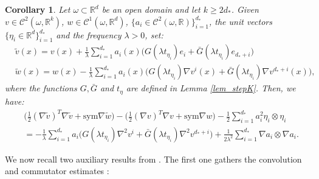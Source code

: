 \documentclass[reqno,twoside,11pt]{amsart}
\newcommand{\sym}{\mathrm{sym}}
\newcommand{\R}{\mathbb{R}}
\numberwithin{equation}{section}
\theoremstyle{plain}
\newtheorem{corollary}[theorem]{Corollary}
\theoremstyle{definition}
\begin{document}
\begin{corollary}\label{cor_indepK}
Let $\omega\subset\R^d$ be an open domain and let $k\geq 2d_*$.
Given $v\in \mathcal{C}^2(\omega, \R^{k})$, $w\in
\mathcal{C}^1(\omega, \R^{d})$,  $\{a_i\in
\mathcal{C}^2(\omega,\R)\}_{i=1}^{d_*}$, the unit vectors
$\{\eta_i\in\R^d\}_{i=1}^{d_*}$ and the frequency $\lambda>0$, set:
\begin{equation*}
\begin{split}
&\tilde v(x) = v(x) + \frac{1}{\lambda} \sum_{i=1}^{d_*} a_i(x)
\Big(G(\lambda t_{\eta_i})e_i +\bar G(\lambda t_{\eta_i})e_{d_*+i}\Big)  \\
& \tilde w(x) = w(x) -\frac{1}{\lambda} \sum_{i=1}^{d_*}
a_i(x)\Big(G(\lambda t_{\eta_i})\nabla v^i(x) +
\bar G(\lambda t_{\eta_i})\nabla v^{d_*+i} (x)\Big),
\end{split}
\end{equation*}
where the functions $G, \bar G$ and $t_\eta$ are defined in Lemma \ref{lem_stepK}.
Then, we have:
\begin{equation*}
\begin{split}
& \big(\frac{1}{2}(\nabla \tilde v)^T \nabla \tilde v + \sym\nabla \tilde w\big) - 
\big(\frac{1}{2}(\nabla v)^T \nabla v + \sym\nabla w\big) -
\frac{1}{2}\sum_{i=1}^{d_*} a_i^2\eta_i\otimes\eta_i 
\\ & = -\frac{1}{\lambda} \sum_{i=1}^{d_*}a_i \Big(G(\lambda t_{\eta_i})\nabla^2 v^i +
\bar G(\lambda t_{\eta_i})\nabla^2 v^{d_*+i}\Big) +
\frac{1}{2\lambda^2} \sum_{i=1}^{d_*} \nabla a_i\otimes \nabla a_i.
\end{split}
\end{equation*}
\end{corollary}

\bigskip

\noindent We now recall two auxiliary results from \cite{CDS}.
The first one gathers the convolution and commutator estimates \cite[Lemma 2.1]{CDS}:
\end{document}
